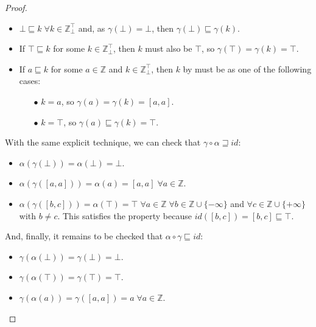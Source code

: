 \documentclass{article}
\begin{document}
\begin{proof}
  \begin{itemize}
    \item $\bot \sqsubseteq k \; 
      \forall k \in \mathbb{Z}_\bot^\top$ and, as $\gamma(\bot) =
      \bot$, then $\gamma(\bot) \sqsubseteq \gamma(k)$.
    
    \item If $\top \sqsubseteq k$ for some $k \in 
      \mathbb{Z}_\bot^\top$, then $k$ must also be $\top$,
      so $\gamma(\top) = \gamma(k) = \top$.

    \item If $a \sqsubseteq k$ for some $a \in \mathbb{Z}$ and
      $k \in \mathbb{Z}_\bot^\top$, then $k$ by must be as one 
      of the following cases:
      
      \begin{itemize}
        \item[$\bullet$] $k = a$, so $\gamma(a) = \gamma(k) = 
          [a, a]$.
          
        \item[$\bullet$] $k = \top$, so $\gamma(a) \sqsubseteq 
          \gamma(k) = \top$.
        \end{itemize}
  \end{itemize}

  With the same explicit technique, we can check that $\gamma 
  \circ \alpha \sqsupseteq id$:

  \begin{itemize}
    \item $\alpha(\gamma(\bot)) = \alpha(\bot) = \bot$.
    
    \item $\alpha(\gamma([a, a])) = \alpha(a) = [a, a] \; 
      \forall a \in \mathbb{Z}$.

    \item $\alpha(\gamma([b, c])) = \alpha(\top) = \top \; 
      \forall a \in \mathbb{Z} 
      \; \forall b \in \mathbb{Z} \cup \{-\infty\}$ and $\forall 
      c \in \mathbb{Z} \cup 
      \{+\infty\}$ with $b \neq c$. This satisfies the property 
      because $id([b, c]) = [b, c] \sqsubseteq \top$.
  \end{itemize}

  And, finally, it remains to be checked that $\alpha \circ 
  \gamma \sqsubseteq id$:

  \begin{itemize}
    \item $\gamma(\alpha(\bot)) = \gamma(\bot) = \bot$.
    
    \item $\gamma(\alpha(\top)) = \gamma(\top) = \top$.

    \item $\gamma(\alpha(a)) = \gamma([a, a]) = a \; 
      \forall a \in \mathbb{Z}$.
  \end{itemize}
\end{proof}
\end{document}
